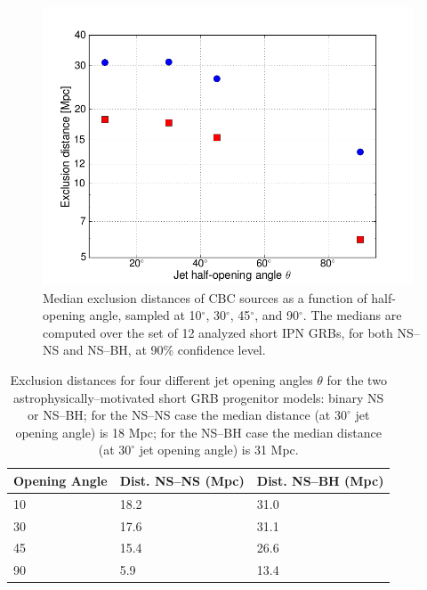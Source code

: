 \begin{figure}[htb]
\centering
\includegraphics[width=26pc]{Images/figure_CBCexclusion_openingangle_points.png}
\caption{Median exclusion distances of CBC sources as a function of
half-opening angle, sampled at 10$^\circ$, 30$^\circ$, 45$^\circ$, 
and 90$^\circ$.  The medians are computed over the set of 12 analyzed short IPN GRBs, 
for both NS--NS and NS--BH, at 90\% confidence level.}
\label{fig:dist_excl_opening}
\end{figure}

\begin{table}[htb]
\begin{center}
\begin{tabular}{*{3}{l}}
\hline
Opening Angle & Dist. NS--NS (Mpc) & Dist. NS--BH (Mpc) \\
\hline
10 & 18.2 & 31.0 \\
30 & 17.6 & 31.1 \\
45 & 15.4 & 26.6 \\
90 & 5.9 & 13.4 \\
\hline
\end{tabular}
\caption{Exclusion distances for four different jet opening angles $\theta$ for the two astrophysically--motivated short GRB progenitor models: binary NS or NS--BH; for the NS--NS case the median distance (at $30^\circ$ jet opening angle) is 18 Mpc; for the NS--BH case the median distance (at $30^\circ$ jet opening angle) is 31 Mpc.}
\label{excl_dist_angles}
\end{center}
\end{table}

